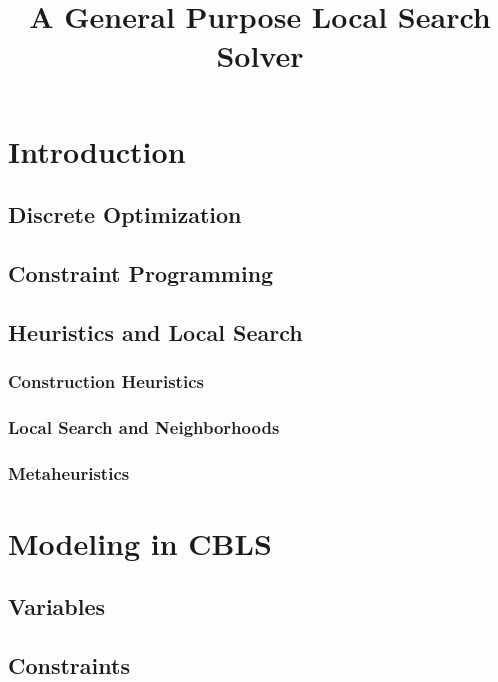 \documentclass[a4paper,12pt]{article}
\title{A General Purpose Local Search Solver}
\begin{document}
\maketitle

\tableofcontents
\newpage
\section{Introduction}
  \subsection{Discrete Optimization}
  \subsection{Constraint Programming}
  \subsection{Heuristics and Local Search}
  \subsubsection{Construction Heuristics}
  \subsubsection{Local Search and Neighborhoods}
  \subsubsection{Metaheuristics}

\section{Modeling in CBLS}
  \subsection{Variables} 
  
  \subsection{Constraints}
  
\end{document}
